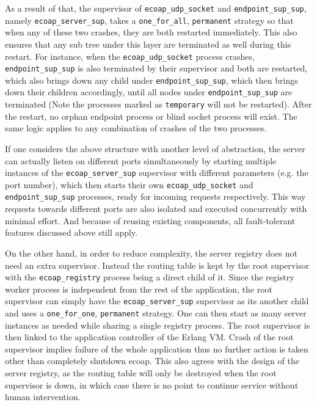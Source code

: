 As a result of that, the supervisor of \verb|ecoap_udp_socket| and \verb|endpoint_sup_sup|, namely \verb|ecoap_server_sup|, takes a \verb|one_for_all|, \verb|permanent| strategy so that when any of these two crashes, they are both restarted immediately. This also ensures that any sub tree under this layer are terminated as well during this restart. For instance, when the \verb|ecoap_udp_socket| process crashes, \verb|endpoint_sup_sup| is also terminated by their supervisor and both are restarted, which also brings down any child under \verb|endpoint_sup_sup|, which then brings down their children accordingly, until all nodes under \verb|endpoint_sup_sup| are terminated (Note the processes marked as \verb|temporary| will not be restarted). After the restart, no orphan endpoint process or blind socket process will exist. The same logic applies to any combination of crashes of the two processes. 

If one considers the above structure with another level of abstraction, the server can actually listen on different ports simultaneously by starting multiple instances of the \verb|ecoap_server_sup| supervisor with different parameters (e.g. the port number), which then starts their own \verb|ecoap_udp_socket| and \verb|endpoint_sup_sup| processes, ready for incoming requests respectively. This way requests towards different ports are also isolated and executed concurrently with minimal effort. And because of reusing existing components, all fault-tolerant features discussed above still apply.

On the other hand, in order to reduce complexity, the server registry does not need an extra supervisor. Instead the routing table is kept by the root supervisor with the \verb|ecoap_registry| process being a direct child of it. Since the registry worker process is independent from the rest of the application, the root supervisor can simply have the \verb|ecoap_server_sup| supervisor as its another child and uses a \verb|one_for_one|, \verb|permanent| strategy. One can then start as many server instances as needed while sharing a single registry process. The root supervisor is then linked to the application controller of the Erlang VM. Crash of the root supervisor implies failure of the whole application thus no further action is taken other than completely shutdown ecoap. This also agrees with the design of the server registry, as the routing table will only be destroyed when the root supervisor is down, in which case there is no point to continue service without human intervention.

